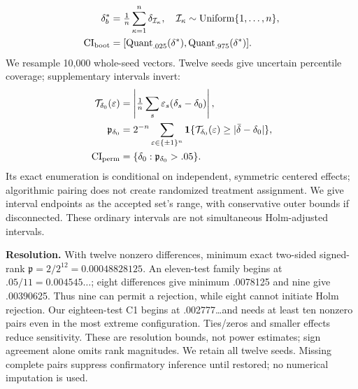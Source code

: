 \documentclass[10pt,a4paper]{article}
\begin{document}
\begin{equation}
\begin{aligned}
\delta_b^*&=\tfrac1n\sum_{\kappa=1}^n\delta_{\mathcal I_\kappa},\quad\mathcal I_\kappa\sim\operatorname{Uniform}\{1,\ldots,n\},\\
\mathrm{CI}_{\rm boot}&=[\operatorname{Quant}_{.025}(\delta^*),\operatorname{Quant}_{.975}(\delta^*)].
\end{aligned}
\label{eq:bootstrap}
\end{equation}
We resample 10,000 whole-seed vectors. Twelve seeds give uncertain percentile coverage; supplementary intervals invert:
\begin{equation}
\begin{aligned}
\mathcal T_{\delta_0}(\varepsilon)&=\left|\tfrac1n\sum_s\varepsilon_s(\delta_s-\delta_0)\right|,\\
\mathfrak p_{\delta_0}&=2^{-n}\sum_{\varepsilon\in\{\pm1\}^n}
\mathbf1\{\mathcal T_{\delta_0}(\varepsilon)\ge|\bar\delta-\delta_0|\},\\
\mathrm{CI}_{\rm perm}&=\{\delta_0:\mathfrak p_{\delta_0}>.05\}.
\end{aligned}
\label{eq:permutation}
\end{equation}
Its exact enumeration is conditional on independent, symmetric centered effects; algorithmic pairing does not create randomized treatment assignment. We give interval endpoints as the accepted set's range, with conservative outer bounds if disconnected. These ordinary intervals are not simultaneous Holm-adjusted intervals.

\textbf{Resolution.} With twelve nonzero differences, minimum exact two-sided signed-rank $\mathfrak p=2/2^{12}=0.00048828125$. An eleven-test family begins at $.05/11=0.004545\ldots$; eight differences give minimum .0078125 and nine give .00390625. Thus nine can permit a rejection, while eight cannot initiate Holm rejection. Our eighteen-test C1 begins at .002777\ldots and needs at least ten nonzero pairs even in the most extreme configuration. Ties/zeros and smaller effects reduce sensitivity. These are resolution bounds, not power estimates; sign agreement alone omits rank magnitudes. We retain all twelve seeds. Missing complete pairs suppress confirmatory inference until restored; no numerical imputation is used.
\end{document}
